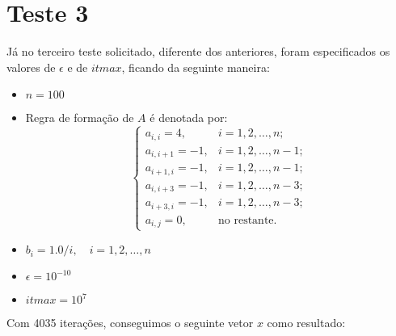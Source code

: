\section{Teste 3}
Já no terceiro teste solicitado, diferente dos anteriores, foram especificados
os valores de \(\epsilon\) e de \(itmax\), ficando da seguinte maneira:

	\begin{itemize}
		\item \(n = 100\)
		\item Regra de formação de \(A\) é denotada por:
		\[
			\begin{cases}
				a_{i,i} = 4,	& i = 1, 2, \ldots, n;\\
				a_{i,i+1} = -1,	& i = 1, 2, \ldots, n-1;\\
				a_{i+1,i} = -1,	& i = 1, 2, \ldots, n-1;\\
				a_{i,i+3} = -1,	& i = 1, 2, \ldots, n-3;\\
				a_{i+3,i} = -1,	& i = 1, 2, \ldots, n-3;\\
				a_{i,j} = 0,	& \mbox{no restante.}
			\end{cases}
		\]
		\item \(b_{i} = 1.0/i, \quad i = 1, 2, \ldots, n\)
		\item \(\epsilon = 10^{-10}\)
		\item \(itmax = 10^{7}\)
	\end{itemize}
Com 4035 iterações, conseguimos o seguinte vetor \(x\) como resultado:
